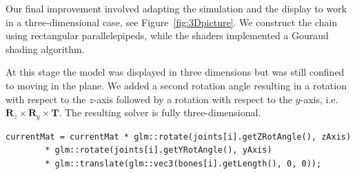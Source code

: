 \documentclass[paper=a4, fontsize=11pt]{scrartcl} %
\numberwithin{equation}{section} %
\numberwithin{figure}{section} %
\numberwithin{table}{section} %
\begin{document}
Our final improvement involved adapting the simulation and the display to work in a three-dimensional case, see Figure~\ref{fig:3Dpicture}. We construct the chain using rectangular parallelepipeds, while the shaders implemented a Gouraud shading algorithm. 


At this stage the model was displayed in three dimensions but was still confined to moving in the plane. We added a second rotation angle resulting in a rotation with respect to the \(z\)-axis followed by a rotation with respect to the \(y\)-axis, i.e. \( \mathbf{R}_z \times \mathbf{R}_y \times \mathbf{T}\). The resulting solver is fully three-dimensional. \\


\begin{lstlisting}[float,caption=Update total transformation with current joint rotation and translation., label={lst:transformation}]
currentMat = currentMat * glm::rotate(joints[i].getZRotAngle(), zAxis)
		* glm::rotate(joints[i].getYRotAngle(), yAxis)
		* glm::translate(glm::vec3(bones[i].getLength(), 0, 0));
\end{lstlisting}
\end{document}
